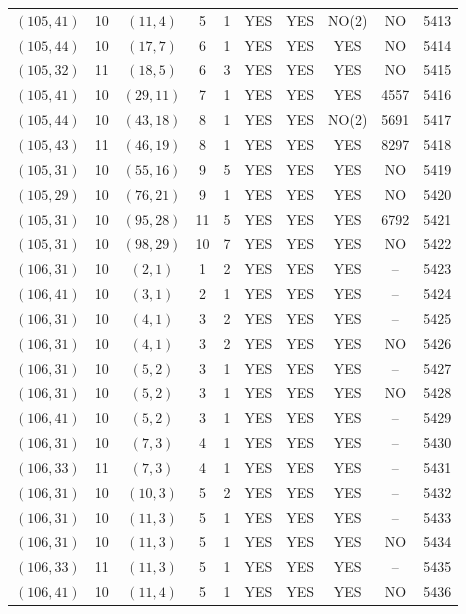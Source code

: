 \begin{longtable}{|c|c|c|c|c|c|c|c|c|c|}
$(105, 41)$ & 10 & $(11, 4)$ & 5 & 1 & YES & YES & NO(2) & NO & 5413\\
$(105, 44)$ & 10 & $(17, 7)$ & 6 & 1 & YES & YES & YES & NO & 5414\\
$(105, 32)$ & 11 & $(18, 5)$ & 6 & 3 & YES & YES & YES & NO & 5415\\
$(105, 41)$ & 10 & $(29, 11)$ & 7 & 1 & YES & YES & YES & 4557 & 5416\\
$(105, 44)$ & 10 & $(43, 18)$ & 8 & 1 & YES & YES & NO(2) & 5691 & 5417\\
$(105, 43)$ & 11 & $(46, 19)$ & 8 & 1 & YES & YES & YES & 8297 & 5418\\
$(105, 31)$ & 10 & $(55, 16)$ & 9 & 5 & YES & YES & YES & NO & 5419\\
$(105, 29)$ & 10 & $(76, 21)$ & 9 & 1 & YES & YES & YES & NO & 5420\\
$(105, 31)$ & 10 & $(95, 28)$ & 11 & 5 & YES & YES & YES & 6792 & 5421\\
$(105, 31)$ & 10 & $(98, 29)$ & 10 & 7 & YES & YES & YES & NO & 5422\\
$(106, 31)$ & 10 & $(2, 1)$ & 1 & 2 & YES & YES & YES & -- & 5423\\
$(106, 41)$ & 10 & $(3, 1)$ & 2 & 1 & YES & YES & YES & -- & 5424\\
$(106, 31)$ & 10 & $(4, 1)$ & 3 & 2 & YES & YES & YES & -- & 5425\\
$(106, 31)$ & 10 & $(4, 1)$ & 3 & 2 & YES & YES & YES & NO & 5426\\
$(106, 31)$ & 10 & $(5, 2)$ & 3 & 1 & YES & YES & YES & -- & 5427\\
$(106, 31)$ & 10 & $(5, 2)$ & 3 & 1 & YES & YES & YES & NO & 5428\\
$(106, 41)$ & 10 & $(5, 2)$ & 3 & 1 & YES & YES & YES & -- & 5429\\
$(106, 31)$ & 10 & $(7, 3)$ & 4 & 1 & YES & YES & YES & -- & 5430\\
$(106, 33)$ & 11 & $(7, 3)$ & 4 & 1 & YES & YES & YES & -- & 5431\\
$(106, 31)$ & 10 & $(10, 3)$ & 5 & 2 & YES & YES & YES & -- & 5432\\
$(106, 31)$ & 10 & $(11, 3)$ & 5 & 1 & YES & YES & YES & -- & 5433\\
$(106, 31)$ & 10 & $(11, 3)$ & 5 & 1 & YES & YES & YES & NO & 5434\\
$(106, 33)$ & 11 & $(11, 3)$ & 5 & 1 & YES & YES & YES & -- & 5435\\
$(106, 41)$ & 10 & $(11, 4)$ & 5 & 1 & YES & YES & YES & NO & 5436\\

\end{longtable}
